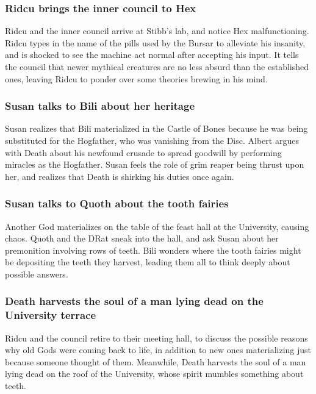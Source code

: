 \subsubsection{\Gls{Ridcu} brings the inner council to \Gls{Hex}}
\Gls{Ridcu} and the inner council arrive at \Gls{Stibb}'s lab, and notice \Gls{Hex} malfunctioning.
\Gls{Ridcu} types in the name of the pills used by the \Gls{Bursar} to alleviate his insanity, and
is shocked to see the machine act normal after accepting his input. It tells the council that
newer mythical creatures are no less absurd than the established ones, leaving \Gls{Ridcu} to ponder
over some theories brewing in his mind.

\subsubsection{\Gls{Susan} talks to \Gls{Bili} about her heritage}
\Gls{Susan} realizes that \Gls{Bili} materialized in the Castle of Bones because he was being
substituted for the Hogfather, who was vanishing from the Disc. \Gls{Albert} argues with \Gls{Death}
about his newfound crusade to spread goodwill by performing miracles as the Hogfather. \Gls{Susan}
feels the role of grim reaper being thrust upon her, and realizes that \Gls{Death} is shirking his
duties once again.

\subsubsection{\Gls{Susan} talks to \Gls{Quoth} about the tooth fairies}
Another God materializes on the table of the feast hall at the University, causing chaos.
\Gls{Quoth} and the \Gls{DRat} sneak into the hall, and ask \Gls{Susan} about her premonition
involving rows of teeth. \Gls{Bili} wonders where the tooth fairies might be depositing the teeth
they harvest, leading them all to think deeply about possible answers.

\subsubsection{\Gls{Death} harvests the soul of a man lying dead on the University terrace}
\Gls{Ridcu} and the council retire to their meeting hall, to discuss the possible reasons why old
Gods were coming back to life, in addition to new ones materializing just because someone thought
of them. Meanwhile, \Gls{Death} harvests the soul of a man lying dead on the roof of the University,
whose spirit mumbles something about teeth.

